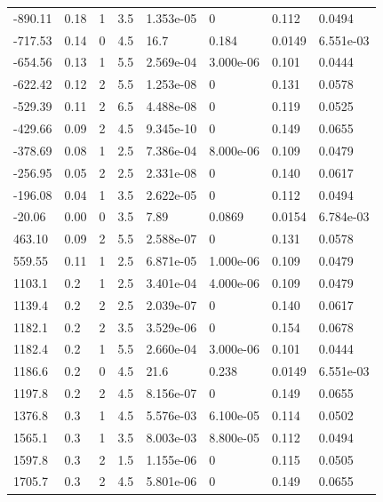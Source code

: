 \documentclass[preview]{standalone}
\begin{document}
{{\begin{tabular}{L{1.2cm}C{1.2cm} C{0.3cm}C{0.5cm} C{1.4cm}C{1.4cm} C{1.4cm}C{1.4cm}}
  -890.11  &  0.18  & 1     & 3.5 &  1.353e-05  & 0  & 0.112 &  0.0494   \\ 
  -717.53  &  0.14  & 0     & 4.5 &  16.7  & 0.184  & 0.0149 &  6.551e-03   \\ 
  -654.56  &  0.13  & 1     & 5.5 &  2.569e-04  & 3.000e-06  & 0.101 &  0.0444   \\ 
  -622.42  &  0.12  & 2     & 5.5 &  1.253e-08  & 0  & 0.131 &  0.0578   \\ 
  -529.39  &  0.11  & 2     & 6.5 &  4.488e-08  & 0  & 0.119 &  0.0525   \\ 
  -429.66  &  0.09  & 2     & 4.5 &  9.345e-10  & 0  & 0.149 &  0.0655   \\ 
  -378.69  &  0.08  & 1     & 2.5 &  7.386e-04  & 8.000e-06  & 0.109 &  0.0479   \\ 
  -256.95  &  0.05  & 2     & 2.5 &  2.331e-08  & 0  & 0.140 &  0.0617   \\ 
  -196.08  &  0.04  & 1     & 3.5 &  2.622e-05  & 0  & 0.112 &  0.0494   \\ 
  -20.06  &  0.00  & 0     & 3.5 &  7.89  & 0.0869  & 0.0154 &  6.784e-03   \\ 
  463.10  &  0.09  & 2     & 5.5 &  2.588e-07  & 0  & 0.131 &  0.0578   \\ 
  559.55  &  0.11  & 1     & 2.5 &  6.871e-05  & 1.000e-06  & 0.109 &  0.0479   \\ 
  1103.1  &   0.2  & 1     & 2.5 &  3.401e-04  & 4.000e-06  & 0.109 &  0.0479   \\ 
  1139.4  &   0.2  & 2     & 2.5 &  2.039e-07  & 0  & 0.140 &  0.0617   \\ 
  1182.1  &   0.2  & 2     & 3.5 &  3.529e-06  & 0  & 0.154 &  0.0678   \\ 
  1182.4  &   0.2  & 1     & 5.5 &  2.660e-04  & 3.000e-06  & 0.101 &  0.0444   \\ 
  1186.6  &   0.2  & 0     & 4.5 &  21.6  & 0.238  & 0.0149 &  6.551e-03   \\ 
  1197.8  &   0.2  & 2     & 4.5 &  8.156e-07  & 0  & 0.149 &  0.0655   \\ 
  1376.8  &   0.3  & 1     & 4.5 &  5.576e-03  & 6.100e-05  & 0.114 &  0.0502   \\ 
  1565.1  &   0.3  & 1     & 3.5 &  8.003e-03  & 8.800e-05  & 0.112 &  0.0494   \\ 
  1597.8  &   0.3  & 2     & 1.5 &  1.155e-06  & 0  & 0.115 &  0.0505   \\ 
  1705.7  &   0.3  & 2     & 4.5 &  5.801e-06  & 0  & 0.149 &  0.0655   \\ 

\end{tabular}}}
\end{document}
